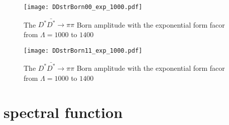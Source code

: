\documentclass[aps,prd,preprintnumbers,showpacs,showkeys,nofootinbib,
superscriptaddress,fleqn,floatfix,tightenlines, 10pt]{revtex4-1}
\begin{document}
\begin{figure}[H]
	\centering
	\texttt{[image: DDstrBorn00\_exp\_1000.pdf]}
	\caption{The $D^* \bar{D^*} \rightarrow \pi\pi$ Born amplitude with the exponential form facor from $\Lambda=1000$ to $1400$}
	\label{expff2}
\end{figure}
\begin{figure}[H]
	\centering
	\texttt{[image: DDstrBorn11\_exp\_1000.pdf]}
	\caption{The $D^* \bar{D^*} \rightarrow \pi\pi$ Born amplitude with the exponential form facor from $\Lambda=1000$ to $1400$}
	\label{expff3}
\end{figure}


\section{spectral function}
\end{document}
